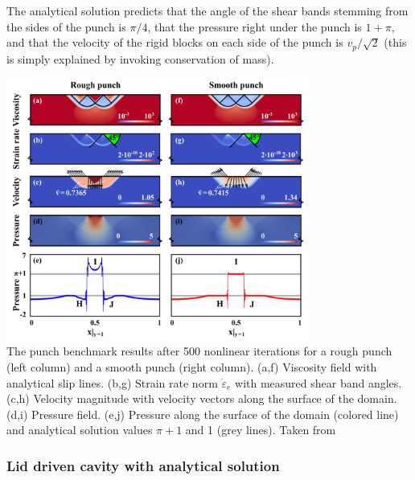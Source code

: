 The analytical solution predicts that the angle of the shear bands stemming from the sides of the punch 
is $\pi/4$, that the pressure right under the punch is $1+\pi$, 
and that the velocity of the rigid blocks on each side of the punch is $v_p/\sqrt{2}$ 
(this is simply explained by invoking conservation of mass).


\begin{center}
\includegraphics[width=10cm]{images/benchmark_punch/gltf18}\\
{\captionfont The punch benchmark results after 500 nonlinear iterations for a rough punch (left column) 
and a smooth punch (right column). (a,f) Viscosity field with analytical slip lines. 
(b,g) Strain rate norm $\dot\varepsilon_e$ with measured shear band angles. 
(c,h) Velocity magnitude with velocity vectors along the surface of the domain.
(d,i) Pressure field. (e,j) Pressure along the surface of the domain (colored line) and analytical 
solution values $\pi + 1$ and 1 (grey lines). Taken from \cite{gltf18}}
\end{center}


\subsubsection{Lid driven cavity with analytical solution} \label{sec:ldc_anal}

